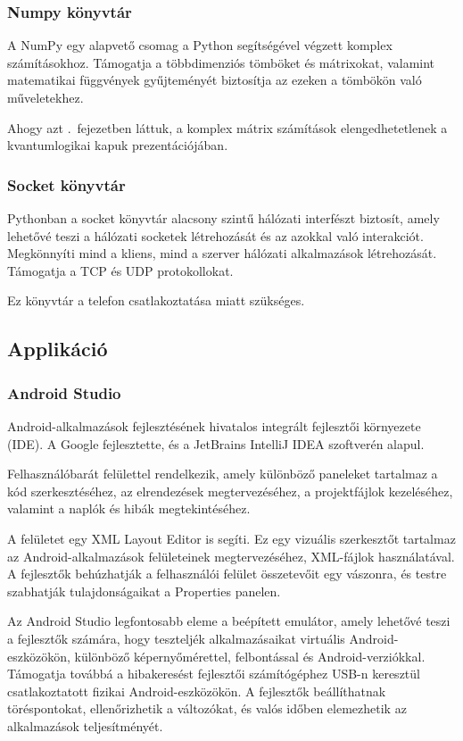 \documentclass[
]{thesis-ekf}
\theoremstyle{definition}
\theoremstyle{remark}
\begin{document}
\subsubsection{Numpy könyvtár}
A NumPy egy alapvető csomag a Python segítségével végzett komplex számításokhoz. Támogatja a többdimenziós tömböket és mátrixokat, valamint matematikai függvények gyűjteményét biztosítja az ezeken a tömbökön való műveletekhez. 

Ahogy azt \az{\ref{kvantumkapuk}}.~fejezetben láttuk, a komplex mátrix számítások elengedhetetlenek a kvantumlogikai kapuk prezentációjában.

\subsubsection{Socket könyvtár}
Pythonban a socket könyvtár alacsony szintű hálózati interfészt biztosít, amely lehetővé teszi a hálózati socketek létrehozását és az azokkal való interakciót. Megkönnyíti mind a kliens, mind a szerver hálózati alkalmazások létrehozását. Támogatja a TCP és UDP protokollokat. 

Ez könyvtár a telefon csatlakoztatása miatt szükséges.

\subsection{Applikáció}
\subsubsection{Android Studio}
Android-alkalmazások fejlesztésének hivatalos integrált fejlesztői környezete (IDE). A Google fejlesztette, és a JetBrains IntelliJ IDEA szoftverén alapul.\cite{Android Studio}

Felhasználóbarát felülettel rendelkezik, amely különböző paneleket tartalmaz a kód szerkesztéséhez, az elrendezések megtervezéséhez, a projektfájlok kezeléséhez, valamint a naplók és hibák megtekintéséhez.

A felületet egy XML Layout Editor is segíti. Ez egy vizuális szerkesztőt tartalmaz az Android-alkalmazások felületeinek megtervezéséhez, XML-fájlok használatával. A fejlesztők behúzhatják a felhasználói felület összetevőit egy vászonra, és testre szabhatják tulajdonságaikat a Properties panelen.

Az Android Studio legfontosabb eleme a beépített emulátor, amely lehetővé teszi a fejlesztők számára, hogy teszteljék alkalmazásaikat virtuális Android-eszközökön, különböző képernyőmérettel, felbontással és Android-verziókkal. Támogatja továbbá a hibakeresést fejlesztői számítógéphez USB-n keresztül csatlakoztatott fizikai Android-eszközökön. A fejlesztők beállíthatnak töréspontokat, ellenőrizhetik a változókat, és valós időben elemezhetik az alkalmazások teljesítményét.
\end{document}
